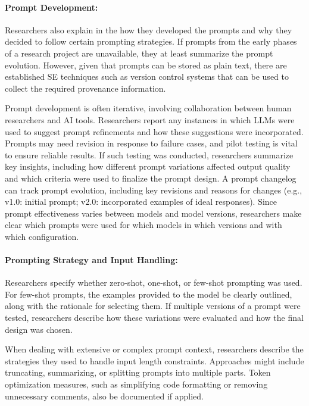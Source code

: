 \paragraph{Prompt Development:}
Researchers \must also explain in the \paper how they developed the prompts and why they decided to follow certain prompting strategies.
If prompts from the early phases of a research project are unavailable, they \must at least summarize the prompt evolution.
However, given that prompts can be stored as plain text, there are established SE techniques such as version control systems that can be used to collect the required provenance information.

Prompt development is often iterative, involving collaboration between human researchers and AI tools.
Researchers \should report any instances in which LLMs were used to suggest prompt refinements and how these suggestions were incorporated.
Prompts may need revision in response to failure cases, and pilot testing is vital to ensure reliable results.
If such testing was conducted, researchers \should summarize key insights, including how different prompt variations affected output quality and which criteria were used to finalize the prompt design.
A prompt changelog can track prompt evolution, including key revisions and reasons for changes (e.g., v1.0: initial prompt; v2.0: incorporated examples of ideal responses).
Since prompt effectiveness varies between models and model versions, researchers \must make clear which prompts were used for which models in which versions and with which configuration.

\paragraph{Prompting Strategy and Input Handling:}
Researchers \must specify whether zero-shot, one-shot, or few-shot prompting was used.
For few-shot prompts, the examples provided to the model \should be clearly outlined, along with the rationale for selecting them.
If multiple versions of a prompt were tested, researchers \should describe how these variations were evaluated and how the final design was chosen.

When dealing with extensive or complex prompt context, researchers \must describe the strategies they used to handle input length constraints.
Approaches might include truncating, summarizing, or splitting prompts into multiple parts.
Token optimization measures, such as simplifying code formatting or removing unnecessary comments, \must also be documented if applied.

